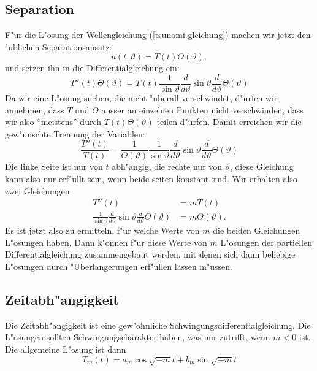 \subsection{Separation}
F"ur die L"osung der Wellengleichung (\ref{tsunami-gleichung}) machen
wir jetzt den "ublichen Separationsansatz:
$$
u(t,\vartheta)=T(t)\Theta(\vartheta),
$$
und setzen ihn in die Differentialgleichung ein:
$$
T''(t)\Theta(\vartheta)=
T(t)
\frac1{\sin\vartheta}
\frac{d}{d\vartheta}
\sin\vartheta
\frac{d}{d\vartheta}\Theta(\vartheta)
$$
Da wir eine L"osung suchen, die nicht "uberall verschwindet,
d"urfen wir annehmen, dass $T$ und $\Theta$ ausser an einzelnen
Punkten nicht verschwinden, dass wir also ``meistens'' durch
$T(t)\Theta(\vartheta)$ teilen d"urfen. Damit erreichen wir
die gew"unschte Trennung der Variablen:
\begin{equation}
\frac{T''(t)}{T(t)}
=
\frac1{\Theta(\vartheta)}
\frac1{\sin\vartheta}
\frac{d}{d\vartheta}
\sin\vartheta
\frac{d}{d\vartheta}\Theta(\vartheta)
\label{tsunami-separiert}
\end{equation}
Die linke Seite ist nur von $t$ abh"angig, die rechte nur von $\vartheta$,
diese Gleichung kann also nur erf"ullt sein, wenn beide seiten konstant
sind.  Wir erhalten also zwei Gleichungen
\begin{align*}
T''(t)&=mT(t)\\
\frac1{\sin\vartheta}
\frac{d}{d\vartheta}
\sin\vartheta
\frac{d}{d\vartheta}\Theta(\vartheta)
&=m\Theta(\vartheta).
\end{align*}
Es ist jetzt also zu ermitteln, f"ur welche Werte von $m$ die beiden
Gleichungen L"osungen haben. Dann k"onnen f"ur diese Werte von $m$ 
L"osungen der partiellen Differentialgleichung zusammengebaut werden,
mit denen sich dann beliebige L"osungen durch "Uberlangerungen
erf"ullen lassen m"ussen.

\subsection{Zeitabh"angigkeit}
Die Zeitabh"angigkeit ist eine gew"ohnliche Schwingungsdifferentialgleichung.
Die L"osungen sollten Schwingungscharakter haben, was nur zutrifft, wenn
$m<0$ ist. Die allgemeine L"osung ist dann
$$
T_m(t)=a_m\cos\sqrt{-m}t+b_m\sin\sqrt{-m}t
$$

